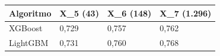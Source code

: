 
\begin{tabular}{llll}
\toprule
Algoritmo & X\_5 (43) & X\_6 (148) & X\_7 (1.296)\\
\midrule
XGBoost & 0,729 & 0,757 & 0,762\\
LightGBM & 0,731 & 0,760 & 0,768\\
\bottomrule
\end{tabular}
